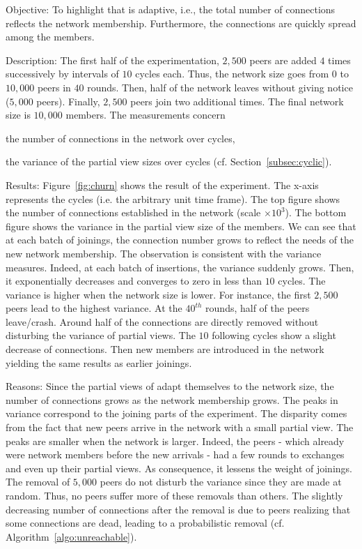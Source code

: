 \begin{asparadesc}
\item[Objective:] To highlight that \SCAMPLON{} is adaptive, i.e., the total
  number of connections reflects the network membership. Furthermore, the
  connections are quickly spread among the members.
\item[Description:] The first half of the experimentation, $2,500$ peers are
  added $4$ times successively by intervals of $10$ cycles each. Thus, the
  network size goes from $0$ to $10,000$ peers in $40$ rounds. Then, half of
  the network leaves without giving notice ($5,000$ peers). Finally, $2,500$
  peers join two additional times. The final network size is $10,000$
  members. The measurements concern
  \begin{inparaenum}
  \item the number of connections in the network over cycles,
  \item the variance of the partial view sizes over cycles
    (cf. Section~\ref{subsec:cyclic}).
  \end{inparaenum}
\item[Results:] Figure~\ref{fig:churn} shows the result of the experiment. The
  x-axis represents the cycles (i.e. the arbitrary unit time frame). The top
  figure shows the number of connections established in the network (scale
  $\times 10^3$). The bottom figure shows the variance in the partial view size
  of the members. We can see that at each batch of joinings, the connection
  number grows to reflect the needs of the new network membership. The
  observation is consistent with the variance measures. Indeed, at each batch
  of insertions, the variance suddenly grows. Then, it exponentially decreases
  and converges to zero in less than $10$ cycles. The variance is higher when
  the network size is lower. For instance, the first $2,500$ peers lead to the
  highest variance. At the $40^{th}$ rounds, half of the peers
  leave/crash. Around half of the connections are directly removed without
  disturbing the variance of partial views. The $10$ following cycles show a
  slight decrease of connections. Then new members are introduced in the
  network yielding the same results as earlier joinings.
\item[Reasons:] Since the partial views of \SCAMPLON{} adapt themselves to the
  network size, the number of connections grows as the network membership
  grows.  The peaks in variance correspond to the joining parts of the
  experiment. The disparity comes from the fact that new peers arrive in the
  network with a small partial view. The peaks are smaller when the network is
  larger. Indeed, the peers - which already were network members before the new
  arrivals - had a few rounds to exchanges and even up their partial views. As
  consequence, it lessens the weight of joinings. The removal of $5,000$ peers
  do not disturb the variance since they are made at random. Thus, no peers
  suffer more of these removals than others. The slightly decreasing number of
  connections after the removal is due to peers realizing that some connections
  are dead, leading to a probabilistic removal
  (cf. Algorithm~\ref{algo:unreachable}).
\end{asparadesc}

